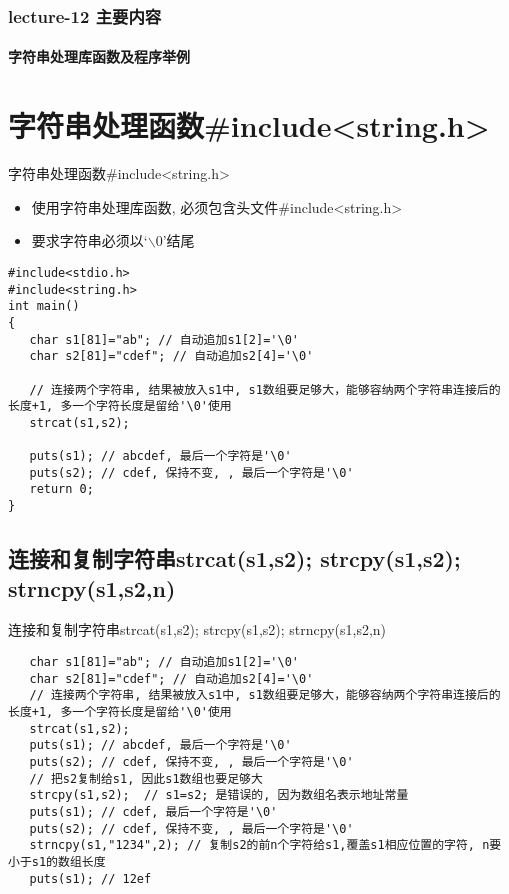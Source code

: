 \begin{frame}[shrink]
  \frametitle{lecture-12 主要内容}
  \framesubtitle{字符串处理库函数及程序举例}
  \tableofcontents
\end{frame}

\section{字符串处理函数\#include<string.h>}

\begin{frame}{字符串处理函数\#include<string.h>}
\begin{itemize}
	\item 使用字符串处理库函数, 必须包含头文件\#include<string.h>
	\item 要求字符串必须以`$\backslash$0'结尾
\end{itemize}
\begin{lstlisting}
#include<stdio.h>
#include<string.h>
int main()
{
   char s1[81]="ab"; // 自动追加s1[2]='\0'
   char s2[81]="cdef"; // 自动追加s2[4]='\0'
   
   // 连接两个字符串, 结果被放入s1中, s1数组要足够大，能够容纳两个字符串连接后的长度+1, 多一个字符长度是留给'\0'使用
   strcat(s1,s2); 
   
   puts(s1); // abcdef, 最后一个字符是'\0'
   puts(s2); // cdef, 保持不变, , 最后一个字符是'\0'
   return 0;
}
\end{lstlisting}
\end{frame}

\subsection{连接和复制字符串strcat(s1,s2); strcpy(s1,s2); strncpy(s1,s2,n)}

\begin{frame}{\small{连接和复制字符串strcat(s1,s2); strcpy(s1,s2); strncpy(s1,s2,n)}}
\begin{lstlisting}
   char s1[81]="ab"; // 自动追加s1[2]='\0'
   char s2[81]="cdef"; // 自动追加s2[4]='\0'
   // 连接两个字符串, 结果被放入s1中, s1数组要足够大，能够容纳两个字符串连接后的长度+1, 多一个字符长度是留给'\0'使用
   strcat(s1,s2); 
   puts(s1); // abcdef, 最后一个字符是'\0'
   puts(s2); // cdef, 保持不变, , 最后一个字符是'\0'
   // 把s2复制给s1, 因此s1数组也要足够大
   strcpy(s1,s2);  // s1=s2; 是错误的, 因为数组名表示地址常量
   puts(s1); // cdef, 最后一个字符是'\0'
   puts(s2); // cdef, 保持不变, , 最后一个字符是'\0'
   strncpy(s1,"1234",2); // 复制s2的前n个字符给s1,覆盖s1相应位置的字符, n要小于s1的数组长度
   puts(s1); // 12ef
\end{lstlisting}
\end{frame}

